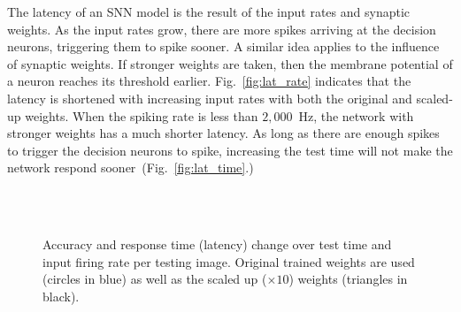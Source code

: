 The latency of an SNN model is the result of the input rates and synaptic weights.
As the input rates grow, there are more spikes arriving at the decision neurons, triggering them to spike sooner.
A similar idea applies to the influence of synaptic weights. If stronger weights are taken, then the membrane potential of a neuron reaches its threshold earlier.
Fig.~\ref{fig:lat_rate} indicates that the latency is shortened with increasing input rates with both the original and scaled-up weights.
When the spiking rate is less than $2,000$~Hz, the network with stronger weights has a much shorter latency.
As long as there are enough spikes to trigger the decision neurons to spike, increasing the test time will not make the network respond sooner~(Fig.~\ref{fig:lat_time}.)
	\begin{figure*}[htb!]
	  \centering
	  	  \\
	  	  \\
	  \caption{Accuracy and response time (latency) change over test time and input firing rate per testing image. Original trained weights are used (circles in blue) as well as the scaled up ($\times10$) weights (triangles in black). }
	  \label{fig:assess}
	\end{figure*}

